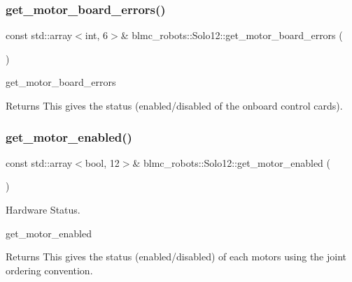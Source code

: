 \subsubsection{\texorpdfstring{get\+\_\+motor\+\_\+board\+\_\+errors()}{get\_motor\_board\_errors()}}
{\footnotesize\ttfamily const std\+::array$<$int, 6$>$\& blmc\+\_\+robots\+::\+Solo12\+::get\+\_\+motor\+\_\+board\+\_\+errors (\begin{DoxyParamCaption}{ }\end{DoxyParamCaption})\hspace{0.3cm}{\ttfamily [inline]}}



get\+\_\+motor\+\_\+board\+\_\+errors 

\begin{DoxyReturn}{Returns}
This gives the status (enabled/disabled of the onboard control cards). 
\end{DoxyReturn}
\mbox{\label{classblmc__robots_1_1Solo12_a079e0ab1f33cb8e6cae03a85f58e8c4f}} 
\subsubsection{\texorpdfstring{get\+\_\+motor\+\_\+enabled()}{get\_motor\_enabled()}}
{\footnotesize\ttfamily const std\+::array$<$bool, 12$>$\& blmc\+\_\+robots\+::\+Solo12\+::get\+\_\+motor\+\_\+enabled (\begin{DoxyParamCaption}{ }\end{DoxyParamCaption})\hspace{0.3cm}{\ttfamily [inline]}}



Hardware Status. 

get\+\_\+motor\+\_\+enabled \begin{DoxyReturn}{Returns}
This gives the status (enabled/disabled) of each motors using the joint ordering convention. 
\end{DoxyReturn}
\mbox{\label{classblmc__robots_1_1Solo12_a9ce8856916fb841f127be1920d18fea9}} 
